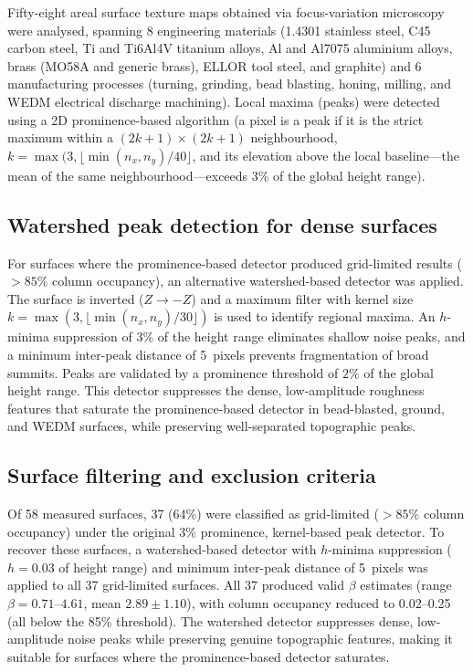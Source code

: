 \documentclass[final,1p,times]{elsarticle}
\theoremstyle{definition}
\begin{document}
Fifty-eight areal surface texture maps obtained via focus-variation
microscopy~\cite{HELMLI-2011-FV, DANZL-2011-FV} were analysed, spanning 8 engineering materials (1.4301
stainless steel, C45 carbon steel, Ti and Ti6Al4V titanium alloys,
Al and Al7075 aluminium alloys, brass (MO58A and generic brass), ELLOR
tool steel, and graphite) and 6 manufacturing processes (turning,
grinding, bead blasting, honing, milling, and WEDM electrical
discharge machining). Local maxima (peaks) were detected using a
2D prominence-based algorithm (a pixel is a peak if it is the
strict maximum within a $(2k+1)\times(2k+1)$ neighbourhood,
$k = \max(3, \lfloor\min(n_x,n_y)/40\rfloor$, and its
elevation above the local baseline---the mean of the same
neighbourhood---exceeds 3\% of the global height range).

\subsection{Watershed peak detection for dense surfaces}

For surfaces where the prominence-based detector produced grid-limited
results ($>85\%$ column occupancy), an alternative watershed-based
detector was applied. The surface is inverted ($Z \to -Z$) and a
maximum filter with kernel size $k = \max(3, \lfloor\min(n_x,n_y)/30\rfloor)$
is used to identify regional maxima. An $h$-minima suppression of
$3\%$ of the height range eliminates shallow noise peaks, and a minimum
inter-peak distance of 5~pixels prevents fragmentation of broad
summits. Peaks are validated by a prominence threshold of $2\%$ of the
global height range. This detector suppresses the dense, low-amplitude
roughness features that saturate the prominence-based detector in
bead-blasted, ground, and WEDM surfaces, while preserving
well-separated topographic peaks.

\subsection{Surface filtering and exclusion criteria}

Of 58 measured surfaces, 37 (64\%) were classified as grid-limited
($>85\%$ column occupancy) under the original 3\% prominence,
kernel-based peak detector. To recover these surfaces, a watershed-based
detector with $h$-minima suppression ($h=0.03$ of height range) and
minimum inter-peak distance of 5~pixels was applied to all 37
grid-limited surfaces. All 37 produced valid $\beta$ estimates (range
$\beta = 0.71$--$4.61$, mean $2.89 \pm 1.10$), with column occupancy
reduced to 0.02--0.25 (all below the 85\% threshold). The watershed
detector suppresses dense, low-amplitude noise peaks while preserving
genuine topographic features, making it suitable for surfaces where
the prominence-based detector saturates.
\end{document}
